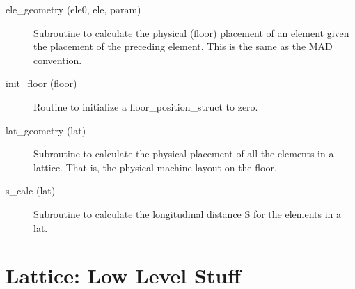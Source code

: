 \begin{description}

\label{r:ele.geometry}
\item[ele_geometry (ele0, ele, param)] \Newline 
Subroutine to calculate the physical (floor) placement of an element given the
placement of the preceding element. This is the same as the MAD convention.

\label{r:init.floor}
\item[init_floor (floor)] \Newline 
Routine to initialize a floor_position_struct to zero.

\label{r:lat.geometry}
\item[lat_geometry (lat)] \Newline
Subroutine to calculate the physical placement of all the elements in a lattice. 
That is, the physical machine layout on the floor. 

\label{r:s.calc}
\item[s_calc (lat)] \Newline
Subroutine to calculate the longitudinal distance S for the elements in a lat. 

\end{description}

\section{Lattice: Low Level Stuff}
\label{r:lat.low} 

